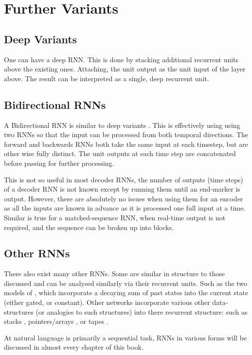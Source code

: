 \documentclass[12pt,parskip]{komatufte}
\begin{document}
\section{Further Variants}
\subsection{Deep Variants}
One can have a deep RNN.
This is done by stacking additional recurrent units above the existing ones.
Attaching, the unit output as the unit input of the layer above.
The result can be interpreted as a single, deep recurrent unit.

\subsection{Bidirectional RNNs}\label{sec:bidirection-rnns}
A Bidirectional RNN is similar to deep variants .
This is effectively using using two RNNs so that the input can be processed from both temporal directions.
The forward and backwards RNNs both take the same input at each timestep, but are other wise fully distinct.
The unit outputs at each time step are concatenated before passing for further processing.

This is not so useful in most decoder RNNs, the number of outputs (time steps) of a decoder RNN is not known except by running them until an end-marker is output.
However, there are absolutely no issues when using them for an encoder as all the inputs are known in advance as it is processed one full input at a time.
Similar is true for a matched-sequence RNN, when real-time output is not required, and the sequence can be broken up into blocks.


\subsection{Other RNNs}
There also exist many other RNNs.
Some are similar in structure to those discussed and can be analysed similarly via their recurrent units.
Such as the two models of , which incorporate a decaying sum of past states into the current state (either gated, or constant).
Other networks incorporate various other data-structures (or analogies to such structures) into there recurrent structure:
such as stacks , pointers/arrays , or tapes .

At natural language is primarily a sequential task, RNNs in various forms will be discussed in almost every chapter of this book.

\end{document}
